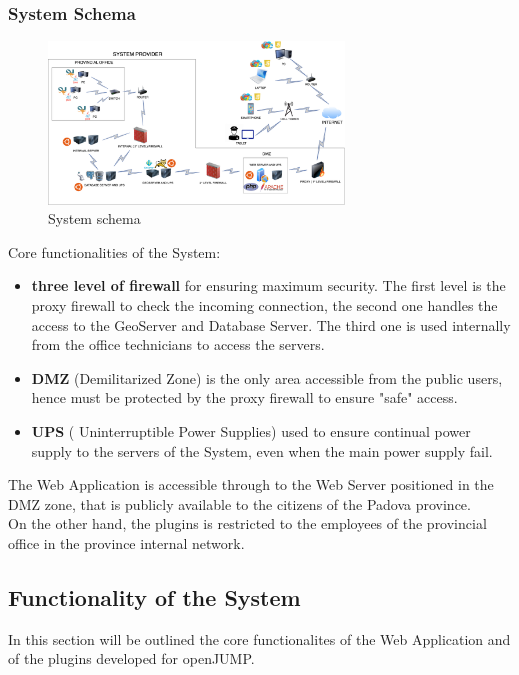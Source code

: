 \subsubsection{System Schema}

     \begin{figure}[h]
        \centering
        \includegraphics[width=0.7\textwidth]{images/system.png}
        \caption{System schema}
        \label{fig:yourlabel}
       \end{figure}


 Core functionalities of the System:
 \begin{itemize}
     \item \textbf{three level of firewall} for ensuring maximum security. The first level is the proxy firewall to check the incoming connection, the second one handles the access to the GeoServer and Database Server.
     The third one is used internally from the office technicians to access the servers.
     \item \textbf{DMZ} (Demilitarized Zone) is the only area accessible from the public users, hence must be protected by the proxy firewall to ensure "safe" access.
     \item \textbf{UPS} ( Uninterruptible Power Supplies) used to ensure continual power supply to the servers of the System, even when the main power supply fail.
 \end{itemize}

The Web Application is accessible through to the Web Server positioned in the DMZ zone, that is publicly available to the citizens of the Padova province. \\
On the other hand, the plugins is restricted to the employees of the provincial office in the province internal network.
 \subsection{Functionality of the System}
 In this section will be outlined the core functionalites of the Web Application and of the plugins developed for openJUMP.

